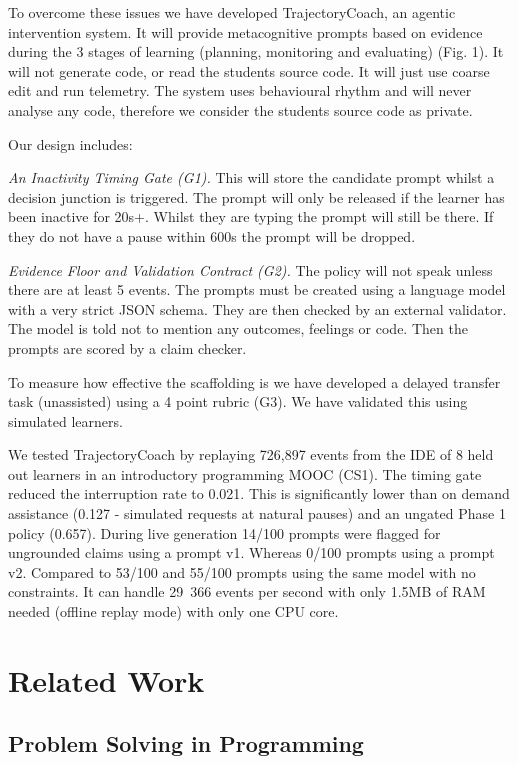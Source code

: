 \documentclass[conference]{IEEEtran}
\begin{document}
To overcome these issues we have developed TrajectoryCoach, an agentic intervention system. It will provide metacognitive prompts based on evidence during the 3 stages of learning (planning, monitoring and evaluating) (Fig. 1). It will not generate code, or read the students source code. It will just use coarse edit and run telemetry. The system uses behavioural rhythm and will never analyse any code, therefore we consider the students source code as private.

Our design includes:

\textit{An Inactivity Timing Gate (G1).} This will store the candidate prompt whilst a decision junction is triggered. The prompt will only be released if the learner has been inactive for 20s+. Whilst they are typing the prompt will still be there. If they do not have a pause within 600s the prompt will be dropped.

\textit{Evidence Floor and Validation Contract (G2).} The policy will not speak unless there are at least 5 events. The prompts must be created using a language model with a very strict JSON schema. They are then checked by an external validator. The model is told not to mention any outcomes, feelings or code. Then the prompts are scored by a claim checker.

To measure how effective the scaffolding is we have developed a delayed transfer task (unassisted) using a 4 point rubric (G3). We have validated this using simulated learners.

We tested TrajectoryCoach by replaying 726,897 events from the IDE of 8 held out learners in an introductory programming MOOC (CS1). The timing gate reduced the interruption rate to 0.021. This is significantly lower than on demand assistance (0.127 - simulated requests at natural pauses) and an ungated Phase 1 policy (0.657). During live generation 14/100 prompts were flagged for ungrounded claims using a prompt v1. Whereas 0/100 prompts using a prompt v2. Compared to 53/100 and 55/100 prompts using the same model with no constraints. It can handle 29~366 events per second with only 1.5MB of RAM needed (offline replay mode) with only one CPU core.

\section{Related Work}

\subsection{Problem Solving in Programming}
\end{document}
